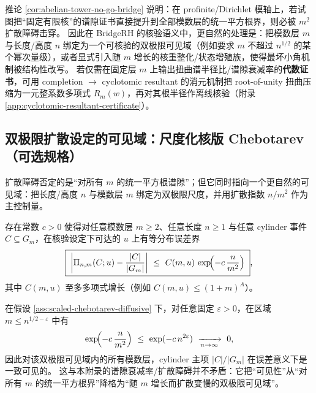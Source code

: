 \begin{remark}\label{rem:diffusion-to-bridge}
推论 \ref{cor:abelian-tower-no-go-bridge} 说明：在 profinite/Dirichlet 模轴上，若试图把“固定有限核”的谱隙证书直接提升到全部模数层的统一平方根界，则必被 \(m^2\) 扩散障碍击穿。
因此在 BridgeRH 的核验语义中，更自然的处理是：把模数层 \(m\) 与长度/高度 \(n\) 绑定为一个可核验的双极限可见域（例如要求 \(m\) 不超过 \(n^{1/2}\) 的某个幂次量级），或者显式引入随 \(m\) 增长的核重整化/状态增殖族，使得最坏小角机制被结构性改写。
若仅需在固定层 \(m\) 上输出扭曲谱半径比/谱隙衰减率的\textbf{代数证书}，可用 completion \(\to\) cyclotomic resultant 的消元机制把 root-of-unity 扭曲压缩为一元整系数多项式 \(R_m(w)\)，再对其根半径作离线核验（附录 \ref{app:cyclotomic-resultant-certificate}）。
\end{remark}

\subsection{双极限扩散设定的可见域：尺度化核版 Chebotarev（可选规格）}\label{subsec:scaled-chebotarev-diffusive-visible}

扩散障碍否定的是“对所有 \(m\) 的统一平方根谱隙”；但它同时指向一个更自然的可见域：把长度/高度 \(n\) 与模数层 \(m\) 绑定为双极限尺度，并用扩散指数 \(n/m^2\) 作为主控制量。

\begin{assumption}\label{ass:scaled-chebotarev-diffusive}
存在常数 \(c>0\) 使得对任意模数层 \(m\ge 2\)、任意长度 \(n\ge 1\) 与任意 cylinder 事件 \(C\subseteq G_m\)，在核验设定下可达的 \(u\) 上有等分布误差界
$$
\boxed{\;
\left|\Pi_{n,m}(C;u)-\frac{|C|}{|G_m|}\right|
\ \le\
C(m,u)\,\exp\!\Bigl(-c\,\frac{n}{m^2}\Bigr)\; },
$$
其中 \(C(m,u)\) 至多多项式增长（例如 \(C(m,u)\le (1+m)^A\)）。
\end{assumption}

\begin{remark}[可见域：\texorpdfstring{$m\le n^{1/2-\varepsilon}$}{m<=n^{1/2-eps}} 内的一致主项]\label{rem:scaled-visible-triangle}
在假设 \ref{ass:scaled-chebotarev-diffusive} 下，对任意固定 \(\varepsilon>0\)，在区域 \(m\le n^{1/2-\varepsilon}\) 中有
$$
\exp\!\Bigl(-c\,\frac{n}{m^2}\Bigr)\ \le\ \exp(-c\,n^{2\varepsilon})\ \xrightarrow[n\to\infty]{}\ 0,
$$
因此对该双极限可见域内的所有模数层，cylinder 主项 \(|C|/|G_m|\) 在误差意义下是一致可见的。
这与本附录的谱隙衰减率/扩散障碍并不矛盾：它把“可见性”从“对所有 \(m\) 的统一平方根界”降格为“随 \(m\) 增长而扩散变慢的双极限可见域”。
\end{remark}

